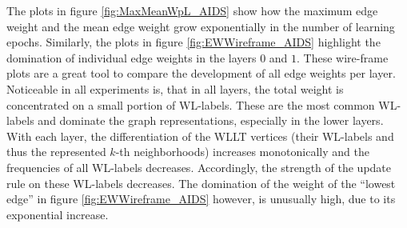 		The plots in figure \ref{fig:MaxMeanWpL_AIDS} show how the maximum edge weight and the mean edge weight grow exponentially in the number of learning epochs.
		Similarly, the plots in figure \ref{fig:EWWireframe_AIDS} highlight the domination of individual edge weights in the layers $0$ and $1$.
		These wire-frame plots are a great tool to compare the development of all edge weights per layer.
		Noticeable in all experiments is, that in all layers, the total weight is concentrated on a small portion of WL-labels.
		These are the most common WL-labels and dominate the graph representations, especially in the lower layers.
		With each layer, the differentiation of the WLLT vertices (their WL-labels and thus the represented $k$-th neighborhoods) increases monotonically and the frequencies of all WL-labels decreases.
		Accordingly, the strength of the update rule on these WL-labels decreases.
		The domination of the weight of the \enquote{lowest edge} in figure \ref{fig:EWWireframe_AIDS} however, is unusually high, due to its exponential increase.
		

